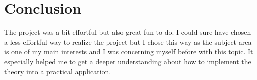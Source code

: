 \documentclass[pdftex,12pt,a4paper]{article}
\begin{document}
\section{Conclusion}
The project was a bit effortful but also great fun to do. I could sure have chosen a less effortful way to realize the project but I chose this way as the subject area is one of my main interests and I was concerning myself before with this topic. It especially helped me to get a deeper understanding about how to implement the theory into a practical application.

\printglossary[numberedsection]
\end{document}
